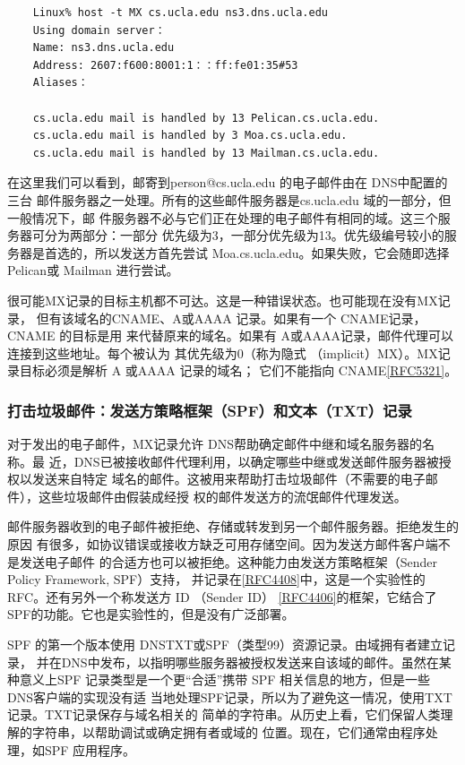 \begin{verbatim}
    Linux% host -t MX cs.ucla.edu ns3.dns.ucla.edu
    Using domain server：
    Name: ns3.dns.ucla.edu
    Address: 2607:f600:8001:1：：ff:fe01:35#53
    Aliases：

    cs.ucla.edu mail is handled by 13 Pelican.cs.ucla.edu.
    cs.ucla.edu mail is handled by 3 Moa.cs.ucla.edu.
    cs.ucla.edu mail is handled by 13 Mailman.cs.ucla.edu.
\end{verbatim}

在这里我们可以看到，邮寄到person@cs.ucla.edu 的电子邮件由在 DNS中配置的三台
邮件服务器之一处理。所有的这些邮件服务器是cs.ucla.edu 域的一部分，但一般情况下，邮
件服务器不必与它们正在处理的电子邮件有相同的域。这三个服务器可分为两部分：一部分
优先级为3，一部分优先级为13。优先级编号较小的服务器是首选的，所以发送方首先尝试
Moa.cs.ucla.edu。如果失败，它会随即选择 Pelican或 Mailman 进行尝试。

很可能MX记录的目标主机都不可达。这是一种错误状态。也可能现在没有MX记录，
但有该域名的CNAME、A或AAAA 记录。如果有一个 CNAME记录，CNAME 的目标是用
来代替原来的域名。如果有 A或AAAA记录，邮件代理可以连接到这些地址。每个被认为
其优先级为0（称为隐式 （implicit）MX）。MX记录目标必须是解析 A 或AAAA 记录的域名；
它们不能指向 CNAME\href{https://www.rfc-editor.org/rfc/rfc5321}{[RFC5321]}。

\subsubsection{打击垃圾邮件：发送方策略框架（SPF）和文本（TXT）记录}

对于发出的电子邮件，MX记录允许 DNS帮助确定邮件中继和域名服务器的名称。最
近，DNS已被接收邮件代理利用，以确定哪些中继或发送邮件服务器被授权以发送来自特定
域名的邮件。这被用来帮助打击垃圾邮件（不需要的电子邮件），这些垃圾邮件由假装成经授
权的邮件发送方的流氓邮件代理发送。

邮件服务器收到的电子邮件被拒绝、存储或转发到另一个邮件服务器。拒绝发生的原因
有很多，如协议错误或接收方缺乏可用存储空间。因为发送方邮件客户端不是发送电子邮件
的合适方也可以被拒绝。这种能力由发送方策略框架（Sender Policy Framework, SPF）支持，
并记录在\href{https://www.rfc-editor.org/rfc/rfc4408}{[RFC4408]}中，这是一个实验性的
RFC。还有另外一个称发送方 ID （Sender ID）
\href{https://www.rfc-editor.org/rfc/rfc4406}{[RFC4406]}的框架，它结合了
SPF的功能。它也是实验性的，但是没有广泛部署。

SPF 的第一个版本使用 DNSTXT或SPF（类型99）资源记录。由域拥有者建立记录，
并在DNS中发布，以指明哪些服务器被授权发送来自该域的邮件。虽然在某种意义上SPF
记录类型是一个更“合适”携带 SPF 相关信息的地方，但是一些 DNS客户端的实现没有适
当地处理SPF记录，所以为了避免这一情况，使用TXT记录。TXT记录保存与域名相关的
简单的字符串。从历史上看，它们保留人类理解的字符串，以帮助调试或确定拥有者或域的
位置。现在，它们通常由程序处理，如SPF 应用程序。

